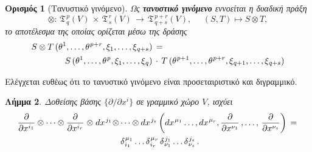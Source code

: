 \documentclass[11pt,a4paper,twoside,openright]{book}
\newtheorem{lemma}{Λήμμα}[section]
\newtheorem{definition}[lemma]{Ορισμός}
\begin{document}
\begin{definition}[Τανυστικό γινόμενο]
	\label{def:tensor-product}
Ως \textbf{τανυστικό γινόμενο} εννοείται η δυαδική πράξη
\begin{equation}\label{eq:tensor-product-scheme}
\otimes:
\,
\mathfrak{T}^{\,p}_{\,q}(V)
\,
\times
\,
\mathfrak{T}^{\,r}_{\,s}(V)
\,
\to
\,
\mathfrak{T}^{\,p+r}_{\,q+s}(V),
\quad\,\,
(S, T) \mapsto S \otimes T,
\end{equation}
το αποτέλεσμα της οποίας ορίζεται μέσω της δράσης
\setlength{\jot}{12pt}
\begin{equation}\label{eq:tensor-product}
\begin{split}
S \otimes T
\,(\theta^1, \dots, \theta^{\hspace{.5pt}p+r}, \xi_1, \dots, \xi_{\hspace{.5pt}q+s})
\,
&=
\,\\
S\,(\theta^1, \dots, \theta^{\hspace{.5pt}p}, \xi_1, \dots, \xi_{\hspace{.5pt}q})
\,&\cdot\,
T\,(\theta^{\hspace{.5pt}p+1}, \dots, \theta^{\hspace{.5pt}p+r}, \xi_{\hspace{.5pt}q+1}, \dots, \xi_{\hspace{.5pt}q+s})
\end{split}
\end{equation}
\end{definition}
\noindent
Ελέγχεται ευθέως ότι το τανυστικό γινόμενο είναι προσεταιριστικό και διγραμμικό.
\begin{lemma}
Δοθείσης βάσης $\{\partial/\partial x^i\}$ σε γραμμικό χώρο $V$,
ισχύει
\setlength{\jot}{12pt}
\begin{equation}\label{eq:tensor-product-kronecker}
\begin{split}
\frac{\partial}{\partial x^{i_1}} \otimes \dots \otimes \frac{\partial}{\partial x^{i_r}}
\hspace{.5pt}
\otimes
\hspace{.5pt}
dx^{\hspace{.75pt}j_1} \hspace{.5pt}
\otimes
&\dots
\otimes dx^{\hspace{.75pt}j_s}
\left(
dx^{\hspace{.5pt}\mu_1}
\dots,
dx^{\hspace{.5pt}\mu_r},
\frac{\partial}{\partial x^{\nu_1}}\,,
\dots,\,
\frac{\partial}{\partial x^{\nu_s}}
\right)
\,=\,\\
&\,\delta_{\hspace{.5pt}i_1}^{\hspace{.75pt}\mu_1} \dots \delta_{\hspace{.5pt}i_r}^{\hspace{.75pt}\mu_r}\,
\delta_{\hspace{.5pt}\nu_1}^{\hspace{.75pt}j_1} \dots \delta_{\hspace{.5pt}\nu_s}^{\hspace{.75pt}j_s}\,.
\end{split}
\end{equation}
\end{lemma}
\end{document}

